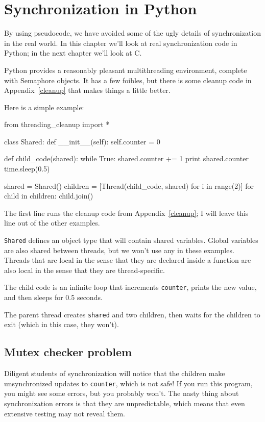 \documentclass{book}
\begin{document}
\chapter{Synchronization in Python}
\label{pysync}

By using pseudocode, we have avoided some of the ugly
details of synchronization in the real world.  In this chapter
we'll look at real synchronization code in Python; in the
next chapter we'll look at C.

Python provides a reasonably pleasant multithreading environment,
complete with Semaphore objects.  It has
a few foibles, but there is some cleanup code in Appendix~\ref{cleanup}
that makes things a little better.

Here is a simple example:

\begin{unbreakable}[]{}
from threading_cleanup import *

class Shared:
    def __init__(self):
        self.counter = 0

def child_code(shared):
    while True:
        shared.counter += 1
        print shared.counter
        time.sleep(0.5)

shared = Shared()
children = [Thread(child_code, shared) 
  for i in range(2)]
for child in children: child.join()
\end{unbreakable}

The first line runs the cleanup code from Appendix~\ref{cleanup};
I will leave this line out of the other examples.

    {\tt Shared} defines an object type that will contain shared variables.
Global variables are also shared between threads, but we won't
use any in these examples.  Threads that are local in the sense
that they are declared inside a function are also local in the
sense that they are thread-specific.

The child code is an infinite loop that increments {\tt counter},
prints the new value, and then sleeps for 0.5 seconds.

The parent thread creates {\tt shared} and two children,
then waits for the children to exit (which in this case, they won't).

\section{Mutex checker problem}

Diligent students of synchronization will notice that the
children make unsynchronized updates to {\tt counter}, which
is not safe!  If you run this program, you might see some
errors, but you probably won't.  The nasty thing about synchronization
errors is that they are unpredictable, which means that even
extensive testing may not reveal them.
\end{document}
